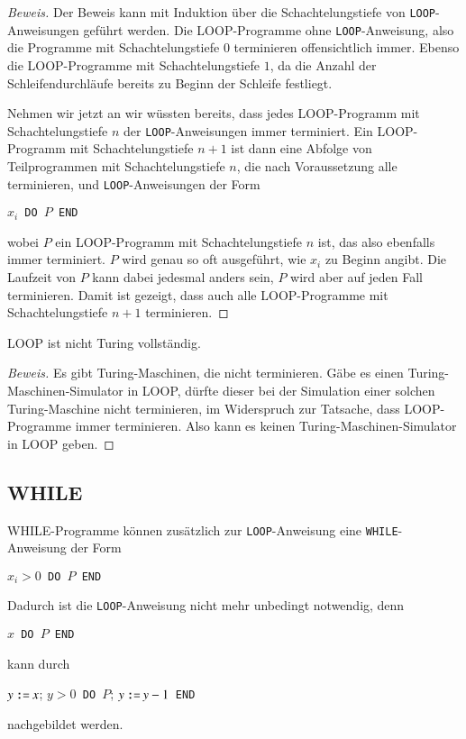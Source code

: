 \begin{proof}[Beweis]
Der Beweis kann mit Induktion über die Schachtelungstiefe
von {\tt LOOP}-Anweisungen geführt werden.
Die LOOP-Programme
ohne {\tt LOOP}-Anweisung, also die Programme mit Schachtelungstiefe
$0$ terminieren offensichtlich immer.
Ebenso die LOOP-Programme
mit Schachtelungstiefe $1$, da die Anzahl der Schleifendurchläufe
bereits zu Beginn der Schleife festliegt.

Nehmen wir jetzt an wir wüssten bereits, dass jedes LOOP-Programm mit
Schachtelungstiefe $n$ der {\tt LOOP}-Anweisungen immer terminiert.
Ein LOOP-Programm mit Schachtelungstiefe $n+1$ ist dann eine
Abfolge von Teilprogrammen mit Schachtelungstiefe $n$, die nach
Voraussetzung alle terminieren, und {\tt LOOP}-Anweisungen der
Form
\begin{algorithmic}
$x_i${\tt\ DO }$P${\tt\ END}
\end{algorithmic}
wobei $P$ ein LOOP-Programm mit Schachtelungstiefe $n$ ist, das also
ebenfalls immer terminiert.
$P$ wird genau so oft ausgeführt, wie $x_i$ zu Beginn angibt.
Die Laufzeit von $P$ kann dabei jedesmal
anders sein, $P$ wird aber auf jeden Fall terminieren.
Damit ist
gezeigt, dass auch alle LOOP-Programme mit Schachtelungstiefe $n+1$
terminieren.
\end{proof}

\begin{satz}
LOOP ist nicht Turing vollständig.
\end{satz}

\begin{proof}[Beweis]
Es gibt Turing-Maschinen, die nicht terminieren.
Gäbe es einen
Turing-Maschinen-Simulator in LOOP, dürfte dieser bei der
Simulation einer solchen Turing-Maschine nicht terminieren, im
Widerspruch zur Tatsache, dass LOOP-Programme immer terminieren.
Also kann es keinen Turing-Maschinen-Simulator in LOOP geben.
\end{proof}

\subsection{WHILE}
%
WHILE-Programme können zusätzlich zur {\tt LOOP}-Anweisung
eine {\tt WHILE}-Anweisung der Form
\begin{algorithmic}
$x_i>0${\tt\ DO }$P${\tt\ END}
\end{algorithmic}
Dadurch ist die {\tt LOOP}-Anweisung nicht mehr unbedingt
notwendig, denn
\begin{algorithmic}
$x${\tt\ DO }$P${\tt\ END}
\end{algorithmic}
kann durch
\begin{algorithmic}
\STATE$y \mathbin{\texttt{:=}} x$;
$y>0${\tt\ DO }$P$; $y \mathbin{\texttt{:=}} y-1${\tt\ END}
\end{algorithmic}
nachgebildet werden.

